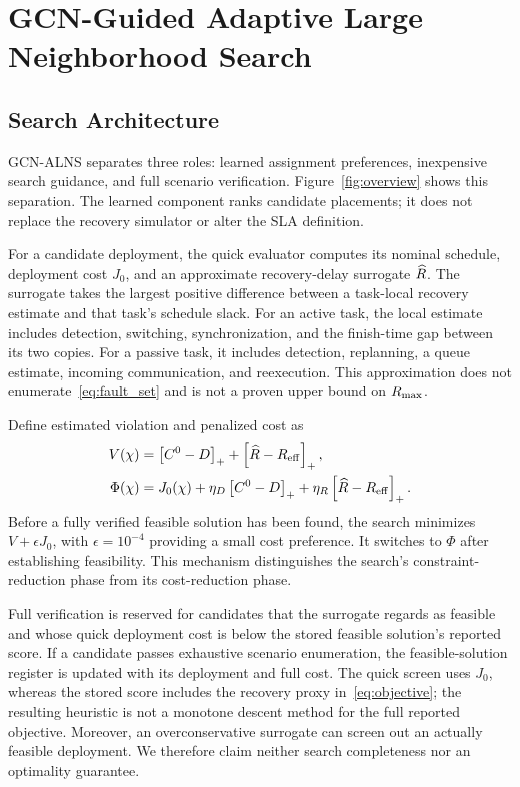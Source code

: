 \section{GCN-Guided Adaptive Large Neighborhood Search}
\label{sec:method}
\subsection{Search Architecture}
GCN-ALNS separates three roles: learned assignment preferences, inexpensive
search guidance, and full scenario verification. Figure~\ref{fig:overview}
shows this separation. The learned component ranks candidate placements; it
does not replace the recovery simulator or alter the SLA definition.

For a candidate deployment, the quick evaluator computes its nominal
schedule, deployment cost $J_0$, and an approximate recovery-delay surrogate
$\widehat{R}$. The surrogate takes the largest positive difference between a
task-local recovery estimate and that task's schedule slack. For an active
task, the local estimate includes detection, switching, synchronization, and
the finish-time gap between its two copies. For a passive task, it includes
detection, replanning, a queue estimate, incoming communication, and
reexecution. This approximation does not enumerate~\eqref{eq:fault_set} and
is not a proven upper bound on $R_{\max}$.

Define estimated violation and penalized cost as
\begin{align}
 V(\chi)&=\left[C^{0}-D\right]_{+}+\left[\widehat{R}-R_{\mathrm{eff}}\right]_{+},\\
 \Phi(\chi)&=J_0(\chi)+\eta_D\left[C^{0}-D\right]_{+}
                     +\eta_R\left[\widehat{R}-R_{\mathrm{eff}}\right]_{+}.
 \label{eq:quick_objective}
\end{align}
Before a fully verified feasible solution has been found, the search
minimizes $V+\epsilon J_0$, with $\epsilon=10^{-4}$ providing a small cost
preference. It switches to $\Phi$ after establishing feasibility. This
mechanism distinguishes the search's constraint-reduction phase from its
cost-reduction phase.

Full verification is reserved for candidates that the surrogate regards as
feasible and whose quick deployment cost is below the stored feasible
solution's reported score. If a candidate passes exhaustive scenario
enumeration, the feasible-solution register is updated with its deployment
and full cost. The quick screen uses $J_0$, whereas the stored score includes
the recovery proxy in~\eqref{eq:objective}; the resulting heuristic is not a
monotone descent method for the full reported objective. Moreover, an
overconservative surrogate can screen out an actually feasible deployment.
We therefore claim neither search completeness nor an optimality guarantee.

